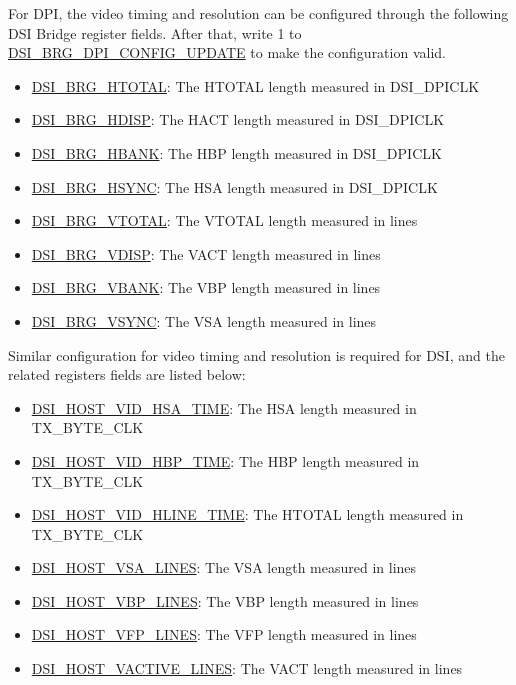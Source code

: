 \documentclass[main\_\_EN.tex]{subfiles}
\begin{document}
For DPI, the video timing and resolution can be configured through the following DSI Bridge register fields. After that, write 1 to \hyperref[fielddesc:DSIBRGDPICONFIGUPDATE]{DSI\_BRG\_DPI\_CONFIG\_UPDATE} to make the configuration valid.
\begin{itemize}
    \item \hyperref[fielddesc:DSIBRGHTOTAL]{DSI\_BRG\_HTOTAL}: The HTOTAL length measured in DSI\_DPICLK
    \item \hyperref[fielddesc:DSIBRGHDISP]{DSI\_BRG\_HDISP}: The HACT length measured in DSI\_DPICLK
    \item \hyperref[fielddesc:DSIBRGHBANK]{DSI\_BRG\_HBANK}: The HBP length measured in DSI\_DPICLK
    \item \hyperref[fielddesc:DSIBRGHSYNC]{DSI\_BRG\_HSYNC}: The HSA length measured in DSI\_DPICLK
    \item \hyperref[fielddesc:DSIBRGVTOTAL]{DSI\_BRG\_VTOTAL}: The VTOTAL length measured in lines
    \item \hyperref[fielddesc:DSIBRGVDISP]{DSI\_BRG\_VDISP}: The VACT length measured in lines
    \item \hyperref[fielddesc:DSIBRGVBANK]{DSI\_BRG\_VBANK}: The VBP length measured in lines
    \item \hyperref[fielddesc:DSIBRGVSYNC]{DSI\_BRG\_VSYNC}: The VSA length measured in lines
\end{itemize}


Similar configuration for video timing and resolution is required for DSI, and the related registers fields are listed below:
\begin{itemize}
    \item \hyperref[fielddesc:DSIHOSTVIDHSATIME]{DSI\_HOST\_VID\_HSA\_TIME}: The HSA length measured in TX\_BYTE\_CLK
    \item \hyperref[fielddesc:DSIHOSTVIDHBPTIME]{DSI\_HOST\_VID\_HBP\_TIME}: The HBP length measured in TX\_BYTE\_CLK
    \item \hyperref[fielddesc:DSIHOSTVIDHLINETIME]{DSI\_HOST\_VID\_HLINE\_TIME}: The HTOTAL length measured in TX\_BYTE\_CLK
    \item \hyperref[fielddesc:DSIHOSTVSALINES]{DSI\_HOST\_VSA\_LINES}: The VSA length measured in lines
    \item \hyperref[fielddesc:DSIHOSTVBPLINES]{DSI\_HOST\_VBP\_LINES}: The VBP length measured in lines
    \item \hyperref[fielddesc:DSIHOSTVFPLINES]{DSI\_HOST\_VFP\_LINES}: The VFP length measured in lines
    \item \hyperref[fielddesc:DSIHOSTVACTIVELINES]{DSI\_HOST\_VACTIVE\_LINES}: The VACT length measured in lines
\end{itemize}
\end{document}
